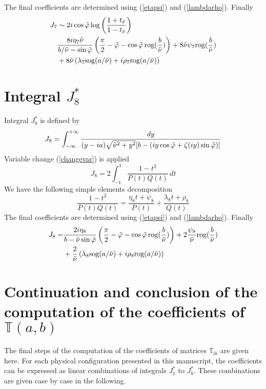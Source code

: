 The final coefficients are determined using (\ref{etapsi}) and (\ref{lambdarho}). Finally
\begin{equation}
\begin{split}
J_7&\sim 2i\cos\tilde{\varphi}\log\left(\frac{1+t_{\tilde{\nu}}}{1-t_{\tilde{\nu}}}\right) \\
&\frac{8i\eta_7\tilde{\nu} }{b/\tilde{\nu}-\sin\tilde{\varphi}}\left(\frac{\pi}{2}-\tilde{\varphi}-\cos\tilde{\varphi} \,\mbox{rog}(\frac{b}{\tilde{\nu}}) \right)+8\tilde{\nu} \psi_7 \mbox{rog}(\frac{b}{\tilde{\nu}} )\\
&+8\tilde{\nu} \left(\lambda_7 \mbox{sog}(a/\tilde{\nu})+i\rho_7 \mbox{rog}(a/\tilde{\nu}) \right)
\end{split}
\label{valJ7}
\end{equation}

\section{Integral $J_8^*$ }
\label{calculJ8}
Integral $J_8^*$ is defined by
\begin{equation}
J_8=\int_{-\infty}^{+\infty}\frac{dy}{(y-ia)\sqrt{\tilde{\nu}^2+y^2}\lbrack b-( iy\cos \tilde{\varphi}+ \zeta(iy)\sin \tilde{\varphi}) \rbrack}
\label{defJ8}
\end{equation}
Variable change (\ref{changevar}) is applied
\begin{equation}
J_8=2 \int_{-1}^{1} \frac{1-t^2}{P(t)Q(t)}\,dt
\end{equation}
We have the following simple elements decomposition
\begin{equation}
\frac{1-t^2}{P(t)Q(t)}=\frac{\eta_8 t+\psi_8}{P(t)}+\frac{\lambda_8 t +\rho_8}{Q(t)}
\end{equation}
The final coefficients are determined using (\ref{etapsi}) and (\ref{lambdarho}). Finally
\begin{equation}
\begin{split}
J_8=&\frac{2i\eta_8 }{b-\tilde{\nu}\sin\tilde{\varphi}}\left(\frac{\pi}{2}-\tilde{\varphi}-\cos\tilde{\varphi} \,\mbox{rog}(\frac{b}{\tilde{\nu}}) \right)+2 \frac{\psi_8}{\tilde{\nu}} \mbox{rog}(\frac{b}{\tilde{\nu}} )\\
&+\frac{2}{\tilde{\nu}} \left(\lambda_8 \mbox{sog}(a/\tilde{\nu})+i\rho_8 \mbox{rog}(a/\tilde{\nu}) \right)
\end{split}
\label{valJ8}
\end{equation}

\section{Continuation and conclusion of the computation of the coefficients of $\mathbb{T}(a,b)$}
\label{fincalculsT}
The final steps of the computation of the coefficients of matrices $\mathbb{T}_{lk}$ are given here. For each physical configuration presented in this manuscript, the coefficients can be expressed as linear combinations of integrals $J_1^*$ to $J_8^*$. These combinations are given case by case in the following.

